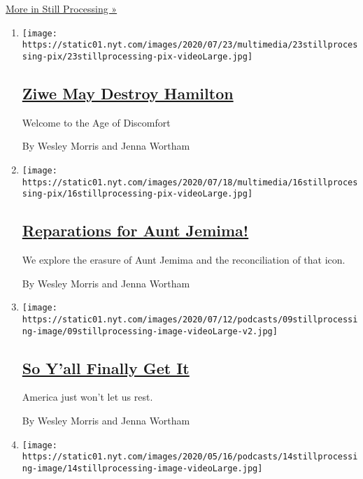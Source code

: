 \href{/column/still-processing-podcast}{More in Still Processing »}

\begin{enumerate}
\def\labelenumi{\arabic{enumi}.}
\item
  \texttt{[image: https://static01.nyt.com/images/2020/07/23/multimedia/23stillprocessing-pix/23stillprocessing-pix-videoLarge.jpg]}

  \hypertarget{ziwe-may-destroy-hamilton}{%
  \subsection{\texorpdfstring{\href{/2020/07/23/podcasts/hamilton-ziwe-discomfort.html}{Ziwe
  May Destroy
  Hamilton}}{Ziwe May Destroy Hamilton}}\label{ziwe-may-destroy-hamilton}}

  Welcome to the Age of Discomfort

  By Wesley Morris and Jenna Wortham
\item
  \texttt{[image: https://static01.nyt.com/images/2020/07/18/multimedia/16stillprocessing-pix/16stillprocessing-pix-videoLarge.jpg]}

  \hypertarget{reparations-for-aunt-jemima}{%
  \subsection{\texorpdfstring{\href{/2020/07/16/podcasts/reparations-for-aunt-jemima.html}{Reparations
  for Aunt
  Jemima!}}{Reparations for Aunt Jemima!}}\label{reparations-for-aunt-jemima}}

  We explore the erasure of Aunt Jemima and the reconciliation of that
  icon.

  By Wesley Morris and Jenna Wortham
\item
  \texttt{[image: https://static01.nyt.com/images/2020/07/12/podcasts/09stillprocessing-image/09stillprocessing-image-videoLarge-v2.jpg]}

  \hypertarget{so-yall-finally-get-it}{%
  \subsection{\texorpdfstring{\href{/2020/07/09/podcasts/still-processing-black-lives-matter.html}{So
  Y'all Finally Get
  It}}{So Y'all Finally Get It}}\label{so-yall-finally-get-it}}

  America just won't let us rest.

  By Wesley Morris and Jenna Wortham
\item
  \texttt{[image: https://static01.nyt.com/images/2020/05/16/podcasts/14stillprocessing-image/14stillprocessing-image-videoLarge.jpg]}


\end{enumerate}
